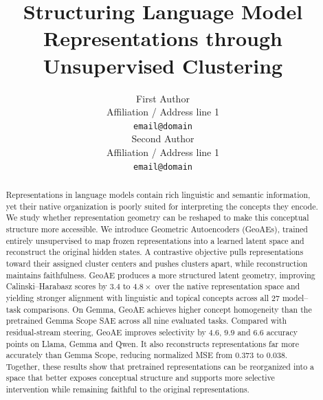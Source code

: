 \documentclass[11pt]{article}
\title{Structuring Language Model Representations through Unsupervised Clustering}
\author{First Author \\
  Affiliation / Address line 1 \\
  \texttt{email@domain} \\\And
  Second Author \\
  Affiliation / Address line 1 \\
  \texttt{email@domain} \\}
\begin{document}
\maketitle
\begin{abstract}
Representations in language models contain rich linguistic and semantic information, yet their native organization is poorly suited for interpreting the concepts they encode. We study whether representation geometry can be reshaped to make this conceptual structure more accessible. We introduce Geometric Autoencoders (GeoAEs), trained entirely unsupervised to map frozen representations into a learned latent space and reconstruct the original hidden states. A contrastive objective pulls representations toward their assigned cluster centers and pushes clusters apart, while reconstruction maintains faithfulness. GeoAE produces a more structured latent geometry, improving Calinski--Harabasz scores by \(3.4\) to \(4.8\times\) over the native representation space and yielding stronger alignment with linguistic and topical concepts across all \(27\) model--task comparisons. On Gemma, GeoAE achieves higher concept homogeneity than the pretrained Gemma Scope SAE across all nine evaluated tasks. Compared with residual-stream steering, GeoAE improves selectivity by \(4.6\), \(9.9\) and \(6.6\) accuracy points on Llama, Gemma and Qwen. It also reconstructs representations far more accurately than Gemma Scope, reducing normalized MSE from \(0.373\) to \(0.038\). Together, these results show that pretrained representations can be reorganized into a space that better exposes conceptual structure and supports more selective intervention while remaining faithful to the original representations.
\end{abstract}
\end{document}
